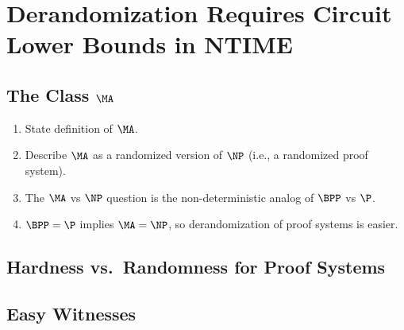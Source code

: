 \chapter{Derandomization Requires Circuit Lower Bounds in NTIME}\label{lec:11}

\section[\texorpdfstring{The Class $\MA$}{The Class MA}]{The Class $\MA$}

\begin{enumerate}
    \item State definition of $\MA$.
    \item Describe $\MA$ as a randomized version of $\NP$ (i.e., a randomized proof system).
    \item The $\MA$ vs $\NP$ question is the non-deterministic analog of $\BPP$ vs $\P$.
    \item $\BPP = \P$ implies $\MA = \NP$, so derandomization of proof systems is easier.
\end{enumerate}

\section{Hardness vs.\ Randomness for Proof Systems}

\section{Easy Witnesses}